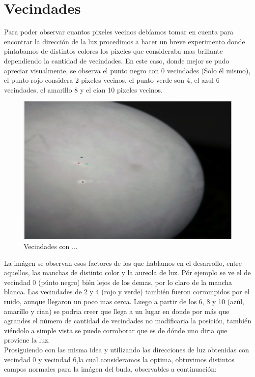 

\section{Vecindades}

Para poder observar cuantos pixeles vecinos debíamos tomar en cuenta para encontrar la dirección de la luz procedimos a hacer un breve experimento donde pintabamos de distintos colores los pixeles que consideraba mas brillante dependiendo la cantidad de vecindades. En este caso, donde mejor se pudo apreciar visualmente, se observa el punto negro con 0 vecindades (Solo él mismo), el punto rojo considera 2 pixeles vecinos, el punto verde son 4, el azul 6 vecindades, el amarillo 8 y el cian 10 pixeles vecinos.

\begin{figure}[h]
   \includegraphics[scale=0.6]{ejemplo.png}
   \caption{Vecindades con ...}
   \label{Fig. 1}
\end{figure}

\indent La imágen se observan esos factores de los que hablamos en el desarrollo, entre aquellos, las manchas de distinto color y la aureola de luz. Pór ejemplo se ve el de vecindad 0 (púnto negro) bién lejos de los demas, por lo claro de la mancha blanca. Las vecindades de 2 y 4 (rojo y verde) también fueron corrompidos por el ruido, aunque llegaron un poco mas cerca. Luego a partir de los 6, 8 y 10 (azúl, amaríllo y cian) se podria creer que llega a un lugar en donde por más que agrandes el número de cantidad de vecindades no modificaria la posición, también viéndolo a simple vista se puede corroborar que es de dónde uno diria que proviene la luz.
\\
Prosiguiendo con las misma idea y utilizando las direcciones de luz obtenidas con vecindad 0 y vecindad 6,la cual consideramos la optima, obtuvimos distintos campos normales para la imágen del buda, observables a continuación:


